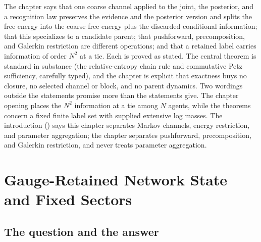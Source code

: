 \begin{verdictbox}{\DELIVERED}
The chapter says that one coarse channel applied to the joint, the posterior, and a recognition law
preserves the evidence and the posterior version and splits the free energy into the coarse free energy
plus the discarded conditional information; that this specializes to a candidate parent; that
pushforward, precomposition, and Galerkin restriction are different operations; and that a retained label
carries information of order $N^2$ at a tie. Each is proved as stated. The central theorem is standard in
substance (the relative-entropy chain rule and commutative Petz sufficiency, carefully typed), and the
chapter is explicit that exactness buys no closure, no selected channel or block, and no parent dynamics.
Two wordings outside the statements promise more than the statements give. The chapter opening places
the $N^2$ information at a tie among $N$ agents, while the theorems concern a fixed finite label set with
supplied extensive log masses. The introduction () says this chapter separates
Markov channels, energy restriction, and parameter aggregation; the chapter separates pushforward,
precomposition, and Galerkin restriction, and never treats parameter aggregation.
\end{verdictbox}

\chapter[Gauge-Retained Network State and Fixed Sectors]{Gauge-Retained Network State\\and Fixed Sectors}
\label{comp:ch10}

\section{The question and the answer}
\label{comp:ch10-question}

